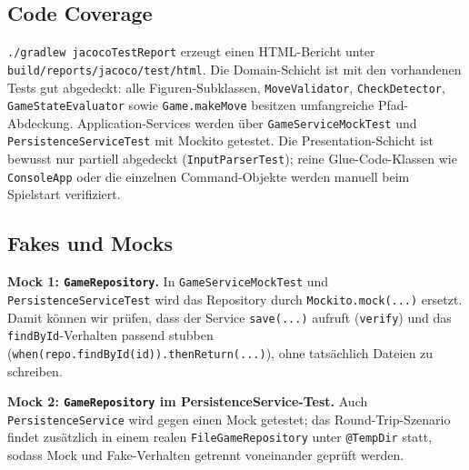 \documentclass[a4paper,12pt]{article}
\begin{document}
\subsection*{Code Coverage}

\texttt{./gradlew jacocoTestReport} erzeugt einen HTML-Bericht unter
\texttt{build/reports/jacoco/test/html}. Die Domain-Schicht ist mit den vorhandenen Tests gut
abgedeckt: alle Figuren-Subklassen, \texttt{MoveValidator}, \texttt{CheckDetector},
\texttt{GameStateEvaluator} sowie \texttt{Game.makeMove} besitzen umfangreiche Pfad-Abdeckung.
Application-Services werden über \texttt{GameServiceMockTest} und \texttt{PersistenceServiceTest}
mit Mockito getestet. Die Presentation-Schicht ist bewusst nur partiell abgedeckt
(\texttt{InputParserTest}); reine Glue-Code-Klassen wie \texttt{ConsoleApp} oder die einzelnen
Command-Objekte werden manuell beim Spielstart verifiziert.

\subsection*{Fakes und Mocks}

\textbf{Mock 1: \texttt{GameRepository}.} In \texttt{GameServiceMockTest} und
\texttt{PersistenceServiceTest} wird das Repository durch \texttt{Mockito.mock(...)} ersetzt. Damit
können wir prüfen, dass der Service \texttt{save(...)} aufruft (\texttt{verify}) und das
\texttt{findById}-Verhalten passend stubben (\texttt{when(repo.findById(id)).thenReturn(...)}),
ohne tatsächlich Dateien zu schreiben.


\textbf{Mock 2: \texttt{GameRepository} im PersistenceService-Test.} Auch \texttt{PersistenceService}
wird gegen einen Mock getestet; das Round-Trip-Szenario findet zusätzlich in einem realen
\texttt{FileGameRepository} unter \texttt{@TempDir} statt, sodass Mock und Fake-Verhalten getrennt
voneinander geprüft werden.

\end{document}
